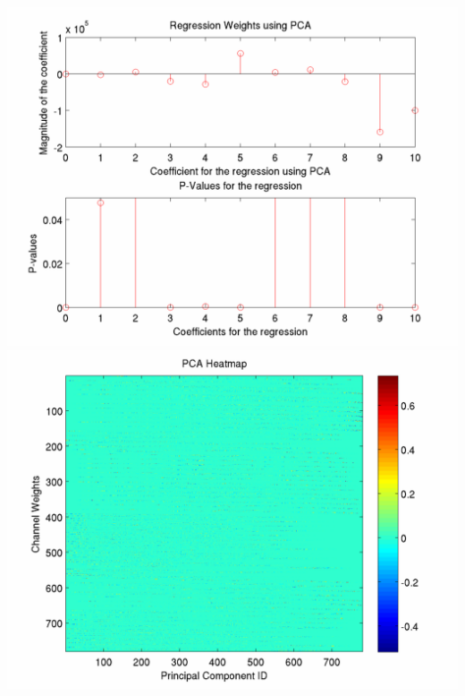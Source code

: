 \documentclass[12pt]{article}
\begin{document}
\includegraphics[scale=0.2]{full_PCA_regression_weights_p_value.png}
\includegraphics[scale=0.2]{full_PCA_heatmap.png}
\end{document}
